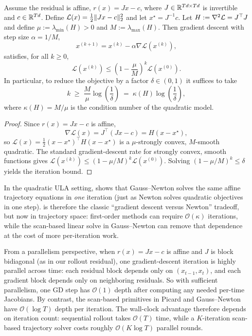 \documentclass[11pt]{article}
\begin{document}
\begin{proposition}
\label{prop:gd-affine-rate}
Assume the residual is affine, $r(x)=Jx-c$, where $J\in\mathbb{R}^{Td\times Td}$ is invertible and $c\in\mathbb{R}^{Td}$.
Define $\mathcal{L}(x)=\tfrac12\lVert Jx-c\rVert_2^2$ and let $x^\star=J^{-1}c$.
Let $H:=\nabla^2\mathcal{L}=J^\top J$ and define $\mu:=\lambda_{\min}(H)>0$ and $M:=\lambda_{\max}(H)$.
Then gradient descent with step size $\alpha=1/M$,
\[
x^{(k+1)} = x^{(k)} - \alpha \nabla \mathcal{L}(x^{(k)}),
\]
satisfies, for all $k\ge 0$,
\[
\mathcal{L}(x^{(k)}) \le \left(1-\frac{\mu}{M}\right)^k \mathcal{L}(x^{(0)}).
\]
In particular, to reduce the objective by a factor $\delta\in(0,1)$ it suffices to take
\[
k \;\ge\; \frac{M}{\mu}\log\!\left(\frac{1}{\delta}\right)
\;=\; \kappa(H)\log\!\left(\frac{1}{\delta}\right),
\]
where $\kappa(H)=M/\mu$ is the condition number of the quadratic model.
\end{proposition}
\begin{proof}
Since $r(x)=Jx-c$ is affine,
\[
\nabla \mathcal{L}(x) = J^\top(Jx-c)=H(x-x^\star),
\]
so $\mathcal{L}(x)=\tfrac12 (x-x^\star)^\top H(x-x^\star)$ is a $\mu$-strongly convex, $M$-smooth quadratic.
The standard gradient-descent rate for strongly convex, smooth functions gives $\mathcal{L}(x^{(k)})\le (1-\mu/M)^k \mathcal{L}(x^{(0)})$.
Solving $(1-\mu/M)^k\le \delta$ yields the iteration bound.%
\end{proof}

In the quadratic ULA setting,  shows that Gauss--Newton solves the same affine trajectory equations in \emph{one} iteration (just as Newton solves quadratic objectives in one step).
 is therefore the classic ``gradient descent versus Newton'' tradeoff, but now in trajectory space:
first-order methods can require $\mathcal{O}(\kappa)$ iterations, while the scan-based linear solve in Gauss--Newton can remove that dependence at the cost of more per-iteration work.

From a parallelism perspective, when $r(x)=Jx-c$ is affine and $J$ is block bidiagonal (as in our rollout residual), one gradient-descent iteration is highly parallel across time: each residual block depends only on $(x_{t-1},x_t)$, and each gradient block depends only on neighboring residuals.
So with sufficient parallelism, one GD step has $\mathcal{O}(1)$ depth after computing any needed per-time Jacobians.
By contrast, the scan-based primitives in Picard and Gauss--Newton have $\mathcal{O}(\log T)$ depth per iteration.
The wall-clock advantage therefore depends on iteration count: sequential rollout takes $\mathcal{O}(T)$ time, while a $K$-iteration scan-based trajectory solver costs roughly $\mathcal{O}(K\log T)$ parallel rounds.%
\end{document}
